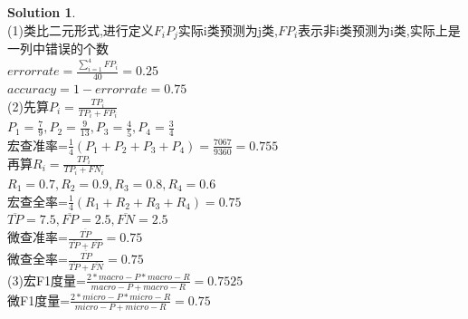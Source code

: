 \documentclass[a4paper,UTF8]{article}
\numberwithin{equation}{section}
\theoremstyle{definition}
\newtheorem*{solution}{Solution}
\begin{document}
\begin{solution}
	~\\
	(1)类比二元形式,进行定义$F_i P_j$实际i类预测为j类,$FP_i$表示非i类预测为i类,实际上是一列中错误的个数\\
	$errorrate=\frac{\sum_{i=1}^{4} FP_i}{40}=0.25$\\
	$accuracy=1-errorrate=0.75$\\
	(2)先算$P_i=\frac{TP_i}{TP_i+FP_i}$\\
	$P_1=\frac{7}{9},P_2=\frac{9}{13},P_3=\frac{4}{5},P_4=\frac{3}{4}$\\
	宏查准率=$\frac{1}{4} (P_1+P_2+P_3+P_4)=\frac{7067}{9360}=0.755$\\
	再算$R_i=\frac{TP_i}{TP_i+FN_i}$\\
	$R_1=0.7,R_2=0.9,R_3=0.8,R_4=0.6$\\
	宏查全率=$\frac{1}{4} (R_1+R_2+R_3+R_4)=0.75$\\
	$\overline{TP}=7.5,\overline{FP}=2.5,\overline{FN}=2.5$\\
	微查准率=$\frac{\overline{TP}}{\overline{TP}+\overline{FP}}=0.75$\\
	微查全率=$\frac{\overline{TP}}{\overline{TP}+\overline{FN}}=0.75$\\
	(3)宏F1度量=$\frac{2*macro-P*macro-R}{macro-P+macro-R}=0.7525$\\
	微F1度量=$\frac{2*micro-P*micro-R}{micro-P+micro-R}=0.75$\\
\end{solution}

\newpage
\end{document}
